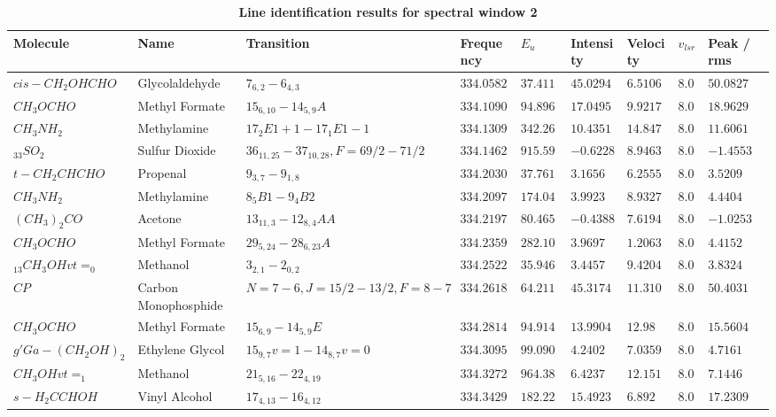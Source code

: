 \documentclass[10pt]{article}
\begin{document}
\newpage 
   \begin{table}[htb]  
    \caption{\textbf{Line identification results for spectral window 2}}
    \tiny
    \centering    
    \begin{tabular}{l l l l l l l l l} 
    \hline     
    Molecule & Name &Transition & Frequency & $E_{u}$ & Intensity & Velocity & $v_{lsr}$ & Peak / rms\\ 
    \hline
$cis-CH_{2}OHCHO$ & Glycolaldehyde & $7_{6,2}-6_{4,3}$ & $334.05821$ & $37.4116$ & $45.0294$ & $6.5106$ & $8.0$ & $50.0827$\\
$CH_{3}OCHO$ & Methyl Formate & $15_{6,10}-14_{5,9}A$ & $334.10909$ & $94.8964$ & $17.0495$ & $9.9217$ & $8.0$ & $18.9629$\\
$CH_{3}NH_{2}$ & Methylamine & $17_{2}E1+1-17_{1}E1-1$ & $334.13094$ & $342.265$ & $10.4351$ & $14.8478$ & $8.0$ & $11.6061$\\
$_{33}SO_{2}$ & Sulfur Dioxide & $36_{11,25}-37_{10,28},F=69/2-71/2$ & $334.14626$ & $915.5991$ & $-0.6228$ & $8.9463$ & $8.0$ & $-1.4553$\\
$t-CH_{2}CHCHO$ & Propenal & $9_{3,7}-9_{1,8}$ & $334.20301$ & $37.7617$ & $3.1656$ & $6.2555$ & $8.0$ & $3.5209$\\
$CH_{3}NH_{2}$ & Methylamine & $8_{5}B1-9_{4}B2$ & $334.20979$ & $174.0493$ & $3.9923$ & $8.9327$ & $8.0$ & $4.4404$\\
$(CH_{3})_{2}CO$ & Acetone & $13_{11,3}-12_{8,4}AA$ & $334.21979$ & $80.4654$ & $-0.4388$ & $7.6194$ & $8.0$ & $-1.0253$\\
$CH_{3}OCHO$ & Methyl Formate & $29_{5,24}-28_{6,23}A$ & $334.23598$ & $282.1007$ & $3.9697$ & $1.2063$ & $8.0$ & $4.4152$\\
$_{13}CH_{3}OHvt=_{0}$ & Methanol & $3_{2,1}-2_{0,2}$ & $334.25221$ & $35.9468$ & $3.4457$ & $9.4204$ & $8.0$ & $3.8324$\\
$CP$ & Carbon Monophosphide & $N=7-6,J=15/2-13/2,F=8-7$ & $334.26182$ & $64.2111$ & $45.3174$ & $11.3104$ & $8.0$ & $50.4031$\\
$CH_{3}OCHO$ & Methyl Formate & $15_{6,9}-14_{5,9}E$ & $334.28144$ & $94.9147$ & $13.9904$ & $12.98$ & $8.0$ & $15.5604$\\
$g'Ga-(CH_{2}OH)_{2}$ & Ethylene Glycol & $15_{9,7}v=1-14_{8,7}v=0$ & $334.30955$ & $99.0907$ & $4.2402$ & $7.0359$ & $8.0$ & $4.7161$\\
$CH_{3}OHvt=_{1}$ & Methanol & $21_{5,16}-22_{4,19}$ & $334.32728$ & $964.3871$ & $6.4237$ & $12.1515$ & $8.0$ & $7.1446$\\
$s-H_{2}CCHOH$ & Vinyl Alcohol & $17_{4,13}-16_{4,12}$ & $334.34291$ & $182.2279$ & $15.4923$ & $6.892$ & $8.0$ & $17.2309$\\

\end{tabular}
\end{table}
\end{document}
